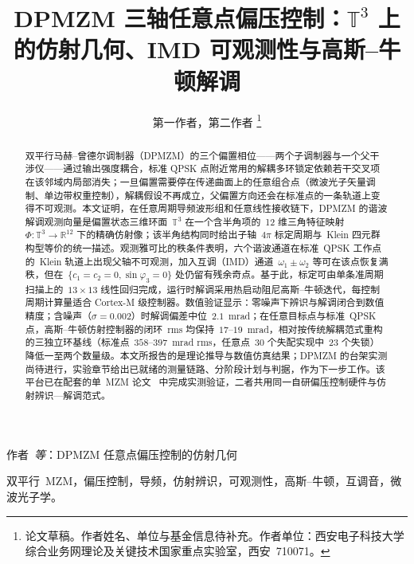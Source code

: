 \documentclass[11pt,journal,onecolumn]{IEEEtran}
\theoremstyle{plain}
\theoremstyle{remark}
\begin{document}
\title{DPMZM 三轴任意点偏压控制：$\mathbb{T}^3$ 上的仿射几何、IMD 可观测性与高斯--牛顿解调}

\author{第一作者，第二作者%
\thanks{论文草稿。作者姓名、单位与基金信息待补充。作者单位：西安电子科技大学综合业务网理论及关键技术国家重点实验室，西安~710071。}}

%
{作者~\MakeLowercase{\textit{等}}：DPMZM 任意点偏压控制的仿射几何}

\maketitle

\begin{abstract}
双平行马赫--曾德尔调制器（DPMZM）的三个偏置相位——两个子调制器与一个父干涉仪——通过输出强度耦合，标准 QPSK 点附近常用的解耦多环锁定依赖若干交叉项在该邻域内局部消失；一旦偏置需要停在传递曲面上的任意组合点（微波光子矢量调制、单边带权重控制），解耦假设不再成立，父偏置方向还会在标准点的一条轨道上变得不可观测。本文证明，在任意周期导频波形组和任意线性接收链下，DPMZM 的谐波解调观测向量是偏置状态三维环面~$\mathbb{T}^3$ 在一个含半角项的~12 维三角特征映射~$\Phi:\mathbb{T}^3\to\mathbb{R}^{12}$ 下的精确仿射像；该半角结构同时给出子轴~$4\pi$ 标定周期与~Klein 四元群构型等价的统一描述。观测雅可比的秩条件表明，六个谐波通道在标准~QPSK 工作点的~Klein 轨道上出现父轴不可观测，加入互调（IMD）通道~$\omega_1\pm\omega_2$ 等可在该点恢复满秩，但在~$\{c_1{=}c_2{=}0,\sin\varphi_3{=}0\}$ 处仍留有残余奇点。基于此，标定可由单条准周期扫描上的~$13\times13$ 线性回归完成，运行时解调采用热启动阻尼高斯--牛顿迭代，每控制周期计算量适合 Cortex-M 级控制器。数值验证显示：零噪声下辨识与解调闭合到数值精度；含噪声（$\sigma{=}0.002$）时解调偏差中位~$2.1$~mrad；在任意目标点与标准~QPSK 点，高斯--牛顿仿射控制器的闭环~rms 均保持~$17$--$19$~mrad，相对按传统解耦范式重构的三独立环基线（标准点~$358$--$397$~mrad rms，任意点~30 个失配实现中~23 个失锁）降低一至两个数量级。本文所报告的是理论推导与数值仿真结果；DPMZM 的台架实测尚待进行，实验章节给出已就绪的测量链路、分阶段计划与判据，作为下一步工作。该平台已在配套的单~MZM 论文~\cite{mzmaffine} 中完成实测验证，二者共用同一自研偏压控制硬件与仿射辨识—解调范式。
\end{abstract}

\begin{IEEEkeywords}
双平行~MZM，偏压控制，导频，仿射辨识，可观测性，高斯--牛顿，互调音，微波光子学。
\end{IEEEkeywords}

\IEEEpeerreviewmaketitle
\setlength{\emergencystretch}{2em}
\end{document}
